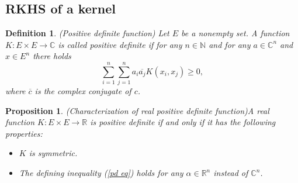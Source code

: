 \documentclass[a4paper,12pt]{article}
\newtheorem{prp}[thm]{Proposition}
\newtheorem{dfn}[thm]{Definition}
\theoremstyle{remark}
\theoremstyle{definition}
\theoremstyle{definition}
\theoremstyle{definition}
\begin{document}
\subsection{RKHS of a kernel}

\begin{dfn} (Positive definite function)
	Let \( E \) be a nonempty set.
	A function \( K: E \times E \to \mathbb{C} \) is called positive definite if for any \( n \in \mathbb{N} \) and for any \( a \in \mathbb{C}^n \) and \( x \in E^n \) there holds
	\begin{equation}
		\sum_{i=1}^{n} \sum_{j=1}^{n} a_i \overline{a_j}K(x_i,x_j) \ge 0, \label{pd eq}
	\end{equation}
	where \( \overline{c} \) is the complex conjugate of \( c \).
\end{dfn}

\begin{prp} (Characterization of real positive definite function)\label{chara real pd}
	A real function \( K:E \times E \to \mathbb{R} \) is positive definite if and only if it has the following properties:
	\begin{itemize}
		\item[(a)] \( K \) is symmetric.
		\item[(b)] The defining inequality (\ref{pd eq}) holds for any \( \alpha \in \mathbb{R}^n \) instead of \( \mathbb{C}^n \).
	\end{itemize}
\end{prp}
\end{document}
